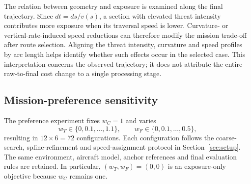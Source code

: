 \documentclass[preprint,12pt]{elsarticle}
\begin{document}
The relation between geometry and exposure is examined along the final
trajectory. Since $dt=ds/v(s)$, a section with elevated threat intensity
contributes more exposure when its traversal speed is lower. Curvature-
or vertical-rate-induced speed reductions can therefore modify the
mission trade-off after route selection. Aligning the threat intensity,
curvature and speed profiles by arc length helps identify whether such
effects occur in the selected case. This interpretation concerns the
observed trajectory; it does not attribute the entire raw-to-final cost
change to a single processing stage.


\subsection{Mission-preference sensitivity}
\label{sec:sensitivity}

The preference experiment fixes $w_C=1$ and varies
\begin{equation}
 w_T\in\{0,0.1,\ldots,1.1\},\qquad
 w_F\in\{0,0.1,\ldots,0.5\},
 \label{ex:eq:weights}
\end{equation}
resulting in $12\times6=72$ configurations. Each configuration follows
the coarse-search, spline-refinement and speed-assignment protocol in
Section~\ref{sec:setup}. The same environment, aircraft model, anchor
references and final evaluation rules are retained. In particular,
$(w_T,w_F)=(0,0)$ is an exposure-only objective because $w_C$ remains one.
\end{document}
